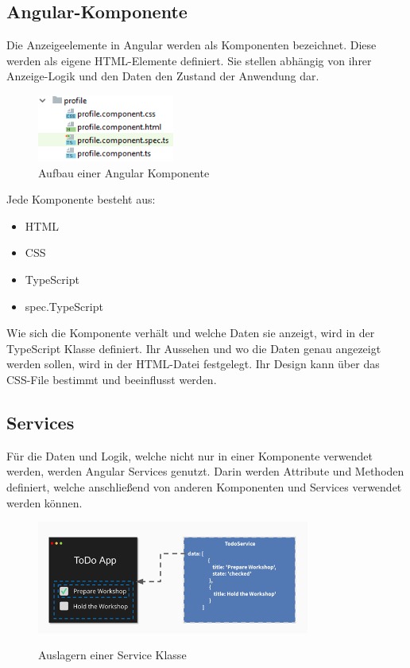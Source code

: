 \subsection{Angular-Komponente}
Die Anzeigeelemente in Angular werden als Komponenten bezeichnet. Diese werden als eigene HTML-Elemente definiert. Sie stellen abhängig von ihrer Anzeige-Logik und den Daten den Zustand der Anwendung dar.

\begin{figure}[h]
    \centering
    \includegraphics[width=0.4\textwidth]{pics/Aufbau_Komponente.png}
    \caption{Aufbau einer Angular Komponente}
\end{figure}

Jede Komponente besteht aus:

\begin{itemize}
    \item HTML
    \item CSS
    \item TypeScript
    \item spec.TypeScript 
\end{itemize}

Wie sich die Komponente verhält und welche Daten sie anzeigt, wird in der TypeScript Klasse definiert. Ihr Aussehen und wo die Daten genau angezeigt werden sollen, wird in der HTML-Datei festgelegt. Ihr Design kann über das CSS-File bestimmt und beeinflusst werden.
\cite{AngularKomponenten}

\subsection{Services}
Für die Daten und Logik, welche nicht nur in einer Komponente verwendet werden, werden Angular Services genutzt. Darin werden Attribute und Methoden definiert, welche anschließend von anderen Komponenten und Services verwendet werden können.

\begin{figure}[h]
    \centering
    \includegraphics[width=0.8\textwidth]{pics/Service_Klasse.png}
    \caption{Auslagern einer Service Klasse}
    \cite{Service}
\end{figure}

